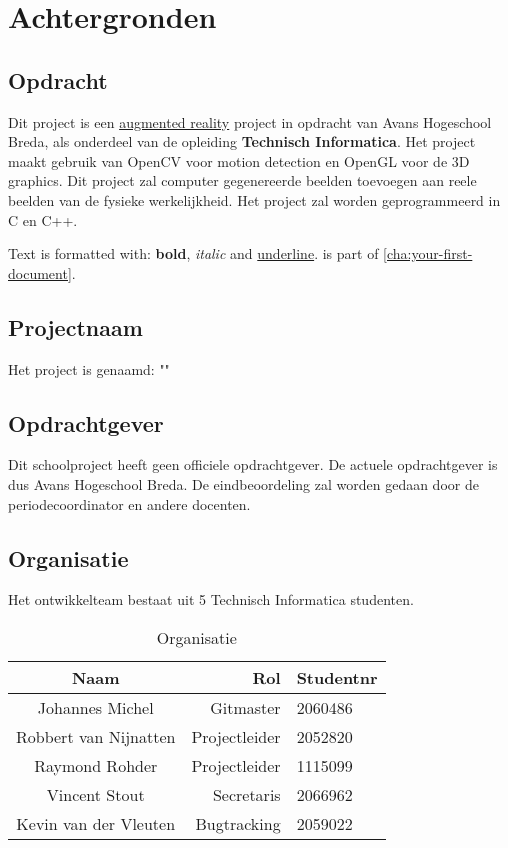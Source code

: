 
\chapter{Achtergronden} \label{cha:achtergrond}

\section{Opdracht} \label{sec:opdracht}

Dit project is een \underline{augmented reality} project in opdracht van Avans Hogeschool Breda, als onderdeel van de opleiding \textbf{Technisch Informatica}. Het project maakt gebruik van OpenCV voor motion detection en OpenGL voor de 3D graphics. Dit project zal computer gegenereerde beelden toevoegen aan reele beelden van de fysieke werkelijkheid. Het project zal worden geprogrammeerd in C en C++.

Text is formatted with: \textbf{bold}, \textit{italic} and \underline{underline}.
 is part of \cref{cha:your-first-document}.

\section{Projectnaam} \label{sec:projectnaam}
Het project is genaamd: "\projectname"

\section{Opdrachtgever} \label{sec:opdrachtgever}
Dit schoolproject heeft geen officiele opdrachtgever. De actuele opdrachtgever is dus Avans Hogeschool Breda. De eindbeoordeling zal worden gedaan door de periodecoordinator en andere docenten.

\section{Organisatie} \label{sec:organisatie}
Het ontwikkelteam bestaat uit 5 Technisch Informatica studenten.
\begin{table}[h]
  \centering
  \caption{Organisatie}
  \label{tb:table}
  \begin{tabular}{crl}
    \toprule
    Naam     		& Rol			& Studentnr\\
    \midrule
    Johannes Michel	& Gitmaster		& 2060486\\
    Robbert van Nijnatten	& Projectleider	& 2052820\\
    Raymond Rohder	& Projectleider	& 1115099\\
    Vincent Stout	& Secretaris	& 2066962\\
    Kevin van der Vleuten	& Bugtracking	& 2059022\\
    \bottomrule
  \end{tabular}
\end{table}

